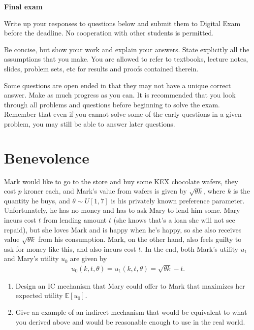 \documentclass[a4paper]{article}
\newif\ifsolutions
\begin{document}
{\ifsolutions \else	
	
\fi}

\begin{center}
		\LARGE\textbf{Final exam {\ifsolutions solutions \fi}}
\end{center}

{\ifsolutions \else	
Write up your responses to questions below and submit them to Digital Exam before the deadline. No cooperation with other students is permitted.

Be concise, but show your work and explain your answers. State explicitly all the assumptions that you make. You are allowed to refer to textbooks, lecture notes, slides, problem sets, etc for results and proofs contained therein.

Some questions are open ended in that they may not have a unique correct answer. Make as much progress as you can. It is recommended that you look through all problems and questions before beginning to solve the exam. Remember that even if you cannot solve some of the early questions in a given problem, you may still be able to answer later questions. 
\fi}



\section{Benevolence}
Mark would like to go to the store and buy some KEX chocolate wafers, they cost $p$ kroner each, and Mark's value from wafers is given by $\sqrt{\theta k}$, where $k$ is the quantity he buys, and $\theta \sim U[1,7]$ is his privately known preference parameter. Unfortunately, he has no money and has to ask Mary to lend him some. Mary incurs cost $t$ from lending amount $t$ (she knows that's a loan she will not see repaid), but she loves Mark and is happy when he's happy, so she also receives value $\sqrt{\theta k}$ from his consumption. Mark, on the other hand, also feels guilty to ask for money like this, and also incurs cost $t$.
In the end, both Mark's utility $u_1$ and Mary's utility $u_0$ are given by
\begin{align*}
	u_0(k,t,\theta) = u_1(k,t,\theta) = \sqrt{\theta k} - t.
\end{align*}

\begin{enumerate}
	\item Design an IC mechanism that Mary could offer to Mark that maximizes her expected utility $\mathbb{E}[u_0]$. 
	\item Give an example of an indirect mechanism that would be equivalent to what you derived above and would be reasonable enough to use in the real world.
\end{enumerate}
\end{document}
